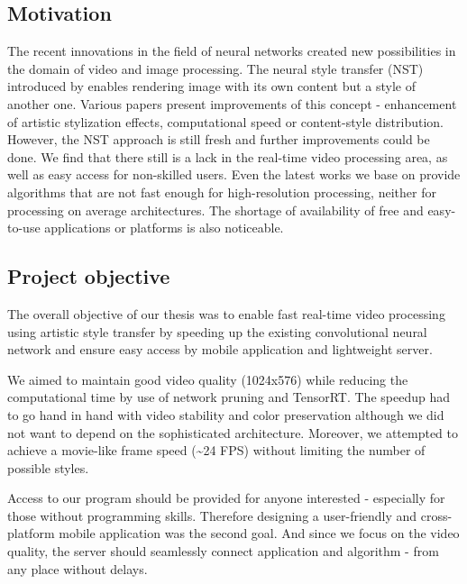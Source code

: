 \documentclass[../Main.tex]{subfiles}
\begin{document}
\subsection{Motivation}
The recent innovations in the field of neural networks created new possibilities in the domain of video and image processing. The neural style transfer (NST) introduced by  enables rendering image with its own content but a style of another one. Various papers present improvements of this concept - enhancement of artistic stylization effects, computational speed or content-style distribution. However, the NST approach is still fresh and further improvements could be done. We find that there still is a lack in the real-time video processing area, as well as easy access for non-skilled users. Even the latest works we base on provide algorithms that are not fast enough for high-resolution processing, neither for processing on average architectures. The shortage of availability of free and easy-to-use applications or platforms is also noticeable.


\subsection{Project objective}
The overall objective of our thesis was to enable fast real-time video processing using artistic style transfer by speeding up the existing convolutional neural network and ensure easy access by mobile application and lightweight server.

We aimed to maintain good video quality (1024x576) while reducing the computational time by use of network pruning and TensorRT. The speedup had to go hand in hand with video stability and color preservation although we did not want to depend on the sophisticated architecture. Moreover, we attempted to achieve a movie-like frame speed (\textasciitilde24 FPS) without limiting the number of possible styles.

Access to our program should be provided for anyone interested - especially for those without programming skills. Therefore designing a user-friendly and cross-platform mobile application was the second goal. And since we focus on the video quality, the server should seamlessly connect application and algorithm - from any place without delays.

\newpage
\end{document}
